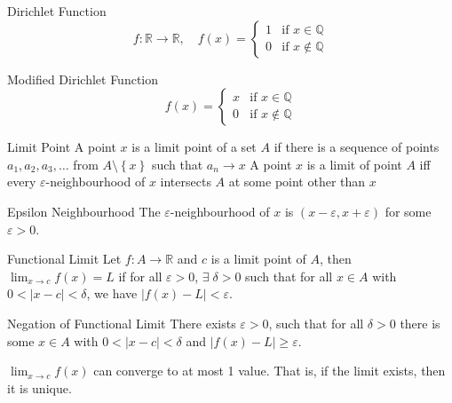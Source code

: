 \documentclass[12pt]{article}
\begin{document}
\begin{definition}{Dirichlet Function}{}
    \[ f : \mathbb{R} \to \mathbb{R}, \quad f \left( x \right) = \begin{cases}
        1 & \text{if } x \in \mathbb{Q} \\
        0 & \text{if } x \notin \mathbb{Q}
    \end{cases} \]
\end{definition}
\begin{definition}{Modified Dirichlet Function}{}
    \[ f \left( x \right) = \begin{cases}
        x & \text{if } x \in \mathbb{Q} \\
        0 & \text{if } x \notin \mathbb{Q}
    \end{cases} \]
\end{definition}
\begin{definition}{Limit Point}{}
    A point $ x $ is a limit point of a set $ A $ if there is a sequence of points $ a_1, a_2, a_3, \dots $ from $ A \setminus \left\{ x \right\} $ such that $ a_n \to x $
    \medskip
    \newline
    A point $ x $ is a limit of point $ A $ iff every $ \varepsilon $-neighbourhood of $ x $ intersects $ A $ at some point other than $ x $
\end{definition}
\begin{definition}{Epsilon Neighbourhood}{}
    The $ \varepsilon $-neighbourhood of $ x $ is $ \left( x - \varepsilon, x + \varepsilon \right) $ for some $ \varepsilon > 0 $.
\end{definition}
\begin{definition}{Functional Limit}{}
    Let $ f : A \to \mathbb{R} $ and $ c $ is a limit point of $ A $, then $ \lim_{x \to c} f \left( x \right) = L $ if for all $ \varepsilon > 0 $, $ \exists \; \delta > 0 $ such that for all $ x \in A $ with $ 0 < | x - c | < \delta $, we have $ | f \left( x \right) - L | < \varepsilon $.
\end{definition}
\begin{definition}{Negation of Functional Limit}{}
    There exists $ \varepsilon > 0 $, such that for all $ \delta > 0 $ there is some $ x \in A $ with $ 0 < | x - c | < \delta $ and $ | f \left( x \right) - L | \geq \varepsilon $.
\end{definition}
\begin{proposition}{}{}
    $ \lim_{x \to c} f \left( x \right) $ can converge to at most 1 value. That is, if the limit exists, then it is unique.
\end{proposition}
\end{document}
